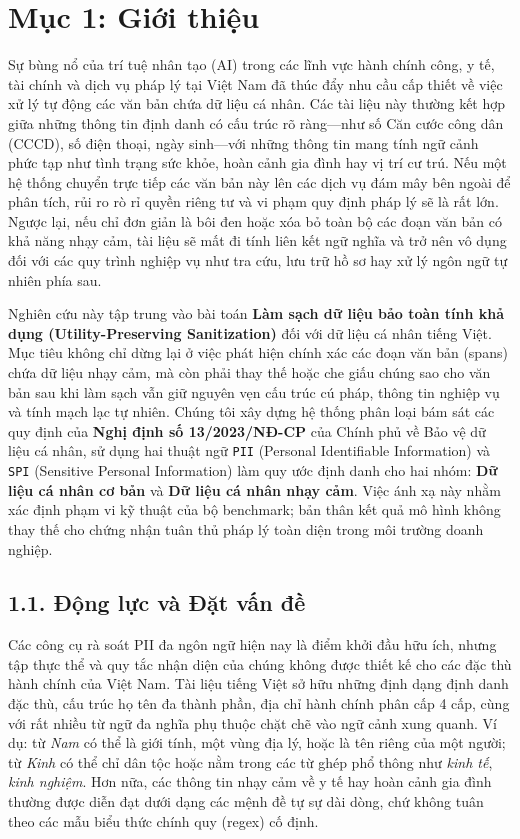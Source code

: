 \documentclass[
  11pt,
  a4paper,
]{article}
\author{}
\date{}
\begin{document}
\section{Mục 1: Giới thiệu}\label{mux1ee5c-1-giux1edbi-thiux1ec7u}

Sự bùng nổ của trí tuệ nhân tạo (AI) trong các lĩnh vực hành chính công, y tế, tài chính và dịch vụ
pháp lý tại Việt Nam đã thúc đẩy nhu cầu cấp thiết về việc xử lý tự động các văn bản chứa dữ liệu cá
nhân. Các tài liệu này thường kết hợp giữa những thông tin định danh có cấu trúc rõ ràng---như số
Căn cước công dân (CCCD), số điện thoại, ngày sinh---với những thông tin mang tính ngữ cảnh phức tạp
như tình trạng sức khỏe, hoàn cảnh gia đình hay vị trí cư trú. Nếu một hệ thống chuyển trực tiếp các
văn bản này lên các dịch vụ đám mây bên ngoài để phân tích, rủi ro rò rỉ quyền riêng tư và vi phạm
quy định pháp lý sẽ là rất lớn. Ngược lại, nếu chỉ đơn giản là bôi đen hoặc xóa bỏ toàn bộ các đoạn
văn bản có khả năng nhạy cảm, tài liệu sẽ mất đi tính liên kết ngữ nghĩa và trở nên vô dụng đối với
các quy trình nghiệp vụ như tra cứu, lưu trữ hồ sơ hay xử lý ngôn ngữ tự nhiên phía sau.

Nghiên cứu này tập trung vào bài toán \textbf{Làm sạch dữ liệu bảo toàn tính khả dụng
(Utility-Preserving Sanitization)} đối với dữ liệu cá nhân tiếng Việt. Mục tiêu không chỉ dừng lại ở
việc phát hiện chính xác các đoạn văn bản (spans) chứa dữ liệu nhạy cảm, mà còn phải thay thế hoặc
che giấu chúng sao cho văn bản sau khi làm sạch vẫn giữ nguyên vẹn cấu trúc cú pháp, thông tin
nghiệp vụ và tính mạch lạc tự nhiên. Chúng tôi xây dựng hệ thống phân loại bám sát các quy định của
\textbf{Nghị định số 13/2023/NĐ-CP} của Chính phủ về Bảo vệ dữ liệu cá nhân, sử dụng hai thuật ngữ
\texttt{PII} (Personal Identifiable Information) và \texttt{SPI} (Sensitive Personal Information)
làm quy ước định danh cho hai nhóm: \textbf{Dữ liệu cá nhân cơ bản} và \textbf{Dữ liệu cá nhân nhạy
cảm}. Việc ánh xạ này nhằm xác định phạm vi kỹ thuật của bộ benchmark; bản thân kết quả mô hình
không thay thế cho chứng nhận tuân thủ pháp lý toàn diện trong môi trường doanh nghiệp.

\subsection{1.1. Động lực và Đặt vấn
đề}\label{ux111ux1ed9ng-lux1ef1c-vuxe0-ux111ux1eb7t-vux1ea5n-ux111ux1ec1}

Các công cụ rà soát PII đa ngôn ngữ hiện nay là điểm khởi đầu hữu ích, nhưng tập thực thể và quy tắc
nhận diện của chúng không được thiết kế cho các đặc thù hành chính của Việt Nam. Tài liệu tiếng Việt
sở hữu những định dạng định danh đặc thù, cấu trúc họ tên đa thành phần, địa chỉ hành chính phân cấp
4 cấp, cùng với rất nhiều từ ngữ đa nghĩa phụ thuộc chặt chẽ vào ngữ cảnh xung quanh. Ví dụ: từ
\emph{Nam} có thể là giới tính, một vùng địa lý, hoặc là tên riêng của một người; từ \emph{Kinh} có
thể chỉ dân tộc hoặc nằm trong các từ ghép phổ thông như \emph{kinh tế}, \emph{kinh nghiệm}. Hơn
nữa, các thông tin nhạy cảm về y tế hay hoàn cảnh gia đình thường được diễn đạt dưới dạng các mệnh
đề tự sự dài dòng, chứ không tuân theo các mẫu biểu thức chính quy (regex) cố định.
\end{document}
